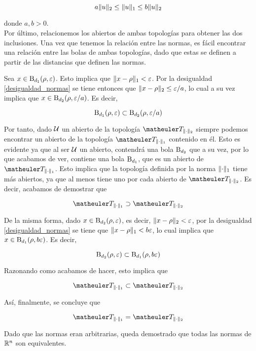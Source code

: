 \begin{equation}\label{desigualdad_normas}
a\lVert u\rVert_2\le \lVert u\rVert_1\le b\lVert u\rVert_2
\end{equation}

donde $a,b>0$.\\



Por último, relacionemos los abiertos de ambas topologías para obtener las dos inclusiones. Una vez que tenemos la relación entre las normas, es fácil encontrar una relación entre las bolas de ambas topologías, dado que estas se definen a partir de las distancias que definen las normas.


Sea $x\in \operatorname{B}_{d_1}(\rho,\varepsilon)$. Esto implica que $\lVert x-\rho\rVert_1<\varepsilon$. Por la desigualdad \eqref{desigualdad_normas} se tiene entonces que $\lVert x-\rho\rVert_2\le\varepsilon/a$, lo cual a su vez implica que $x\in \operatorname{B}_{d_2}(\rho,\varepsilon/a)$. Es decir,

\begin{equation*}
\operatorname{B}_{d_1}(\rho,\varepsilon)\subset \operatorname{B}_{d_2}(\rho,\varepsilon/a)
\end{equation*}

Por tanto, dado $\mathcal{U}$ un abierto de la topología $\T_{\norm{\cdot}_2}$ siempre podemos encontrar un abierto de la topología $\T_{\norm{\cdot}_1}$ contenido en él. Esto es evidente ya que al ser $\mathcal{U}$ un abierto, contendrá una bola $\operatorname{B}_{d_2}$ que a su vez, por lo que acabamos de ver, contiene una bola $\operatorname{B}_{d_1}$, que es un abierto de $\T_{\norm{\cdot}_1}$. Esto implica que la topología definida por la norma $\lVert\cdot\rVert_1$ tiene más abiertos, ya que al menos tiene uno por cada abierto de $\T_{\norm{\cdot}_2}$. Es decir, acabamos de demostrar que

\begin{equation*}
\T_{\norm{\cdot}_1}\supset\T_{\norm{\cdot}_2}
\end{equation*}


De la misma forma, dado $x\in \operatorname{B}_{d_2}(\rho,\varepsilon)$, es decir, $\lVert x-\rho\rVert_2<\varepsilon$, por la desigualdad \eqref{desigualdad_normas} se tiene que $\lVert x-\rho\rVert_1<b\varepsilon$, lo cual implica que $x\in \operatorname{B}_{d_1}(\rho,b\varepsilon)$. Es decir,

\begin{equation*}
\operatorname{B}_{d_2}(\rho,\varepsilon)\subset \operatorname{B}_{d_1}(\rho,b\varepsilon)
\end{equation*}


Razonando como acabamos de hacer, esto implica que

\begin{equation*}
\T_{\norm{\cdot}_1}\subset\T_{\norm{\cdot}_2}
\end{equation*}

Así, finalmente, se concluye que

\begin{equation}
\T_{\norm{\cdot}_1}=\T_{\norm{\cdot}_2}
\end{equation}

Dado que las normas eran arbitrarias, queda demostrado que todas las normas de $\mathbb{R}^n$ son equivalentes.
